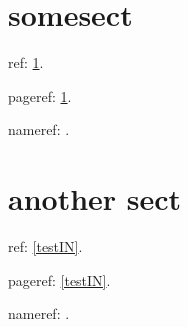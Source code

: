 \documentclass{ltugboat}
\begin{document}
\section{somesect}\label{testA}

ref: \ref{testA}.

pageref: \ref{testA}.

nameref: .

\section{another sect\label{testIN}}

ref: \ref{testIN}.

pageref: \ref{testIN}.

nameref: .
\end{document}
